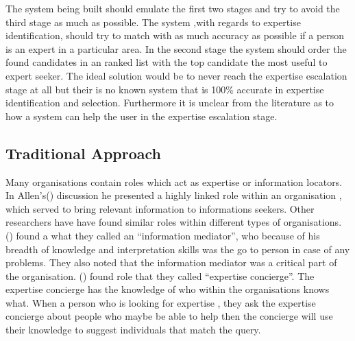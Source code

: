 \documentclass[a4paper,oneside,11pt]{report}
\begin{document}
The system being built should emulate the first two stages and try to avoid the third stage as much as possible. The system ,with regards to expertise identification, should try to match with as much accuracy as possible if a person is an expert in a particular area. In the second stage the system should order the found candidates in an ranked list with the top candidate the most useful to expert seeker. The ideal solution would be to never reach the expertise escalation stage at all but their is no known system that is 100\% accurate in expertise identification and selection. Furthermore it is unclear from the literature as to how a system can help the user in the expertise escalation stage.

\subsection{Traditional Approach}
Many organisations contain roles which act as expertise or information locators.
In Allen's(\citeyear{allen1977}) discussion he presented a highly linked role within an organisation , which served to bring relevant information to informations seekers. Other researchers have have found similar roles within different types of organisations. \citeauthor{ehrlichcash1994}(\citeyear{ehrlichcash1994}) found a what they called an \enquote{information mediator}, who because of his breadth of knowledge and interpretation skills was the go to person in case of any problems. They also noted that the information mediator was a critical part of the organisation. \citeauthor{mcdonalackerman1998}(\citeyear{mcdonalackerman1998}) found role that they called \enquote{expertise concierge}. The expertise concierge has the knowledge of who within the organisations knows what. When a person who is looking for expertise , they ask the expertise concierge about people who maybe be able to help then the concierge will use their knowledge to suggest individuals that match the query.
\end{document}
